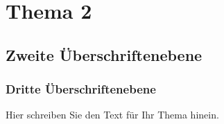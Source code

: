 \chapter{Thema 2}
\section{Zweite Überschriftenebene}
\subsection{Dritte Überschriftenebene}
Hier schreiben Sie den Text für Ihr Thema hinein.
